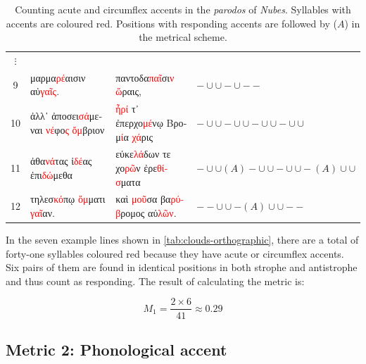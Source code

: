 \documentclass[twoside]{article}
\newcommand{\longa}{-}        %
\newcommand{\brevis}{\cup}    %
\begin{document}
\begin{table}[ht]
{\begin{tabular}{c l l l}
            $\vdots$ & & & \\
            
            9 &
            \textgreek{μαρμα\textcolor{red}{ρέ}αισιν αὐ\textcolor{red}{γαῖς}.} &
            \textgreek{παντοδα\textcolor{red}{παῖ}σι\textcolor{red}{ν ὥ}ραις}, &
            $\longa\brevis\brevis\longa\brevis\longa\longa$ \\
            
            10 &
            \textgreek{ἀλλ᾽ ἀποσει\textcolor{red}{σά}μεναι \textcolor{red}{νέ}φο\textcolor{red}{ς ὄμ}βριον} &
            \textgreek{\textcolor{red}{ἦ}\textcolor{red}{ρί} τ᾽ ἐπερχο\textcolor{red}{μέ}νῳ Βρομ\textcolor{red}{ί}α \textcolor{red}{χά}ρις} &
            $\longa\brevis\brevis\longa\brevis\brevis\longa\brevis\brevis\longa\brevis\brevis$ \\
            
            11 &
            \textgreek{ἀθα\textcolor{red}{νά}τας ἰ\textcolor{red}{δέ}ας ἐπι\textcolor{red}{δώ}μεθα} &
            \textgreek{εὐκε\textcolor{red}{λά}δων τε χο\textcolor{red}{ρῶ}ν ἐρε\textcolor{red}{θίσ}ματα} &
            $\longa\brevis\brevis(A)\longa\brevis\brevis\longa\brevis\brevis\longa(A)\brevis\brevis$ \\
            
            12 &
            \textgreek{τηλεσ\textcolor{red}{κό}πῳ \textcolor{red}{ὄμ}ματι \textcolor{red}{γαῖ}αν.} &
            \textgreek{καὶ \textcolor{red}{μοῦ}σα βα\textcolor{red}{ρύβ}ρομος αὐ\textcolor{red}{λῶν}.} &
            $\longa\longa\brevis\brevis\longa(A)\brevis\brevis\longa\longa$ \\
            \hline
        \end{tabular}
    }
    \caption{Counting acute and circumflex accents in the \textit{parodos} of \textit{Nubes}. Syllables with accents are coloured red. Positions with responding accents are followed by ($A$) in the metrical scheme.}
    \label{tab:clouds-orthographic}
\end{table}

In the seven example lines shown in \autoref{tab:clouds-orthographic}, there are a total of forty-one syllables coloured red because they have acute or circumflex accents. Six pairs of them are found in identical positions in both strophe and antistrophe and thus count as responding. The result of calculating the metric is:

\[
M_1 = \frac{2 \times 6}{41} \approx 0.29
\]

\subsection{Metric 2: Phonological accent}\label{sec:barys}
\end{document}
